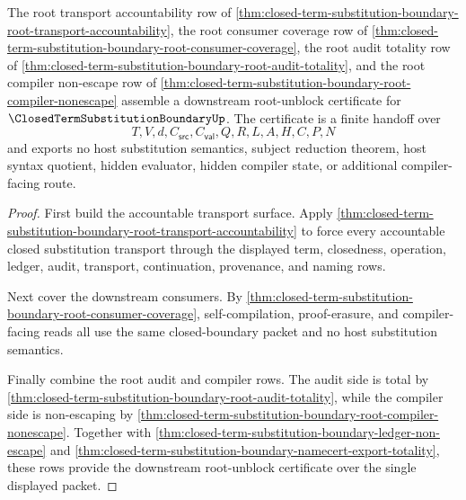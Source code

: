 \begin{theorem}
\label{thm:closed-term-substitution-boundary-root-unblock-certificate}
The root transport accountability row of \autoref{thm:closed-term-substitution-boundary-root-transport-accountability}, the root consumer coverage row of \autoref{thm:closed-term-substitution-boundary-root-consumer-coverage}, the root audit totality row of \autoref{thm:closed-term-substitution-boundary-root-audit-totality}, and the root compiler non-escape row of \autoref{thm:closed-term-substitution-boundary-root-compiler-nonescape} assemble a downstream root-unblock certificate for $\ClosedTermSubstitutionBoundaryUp$. The certificate is a finite handoff over
$$
T,V,d,C_{\mathsf{src}},C_{\mathsf{val}},Q,R,L,A,H,C,P,N
$$
and exports no host substitution semantics, subject reduction theorem, host syntax quotient, hidden evaluator, hidden compiler state, or additional compiler-facing route.
\end{theorem}
\begin{proof}
First build the accountable transport surface. Apply \autoref{thm:closed-term-substitution-boundary-root-transport-accountability} to force every accountable closed substitution transport through the displayed term, closedness, operation, ledger, audit, transport, continuation, provenance, and naming rows.

Next cover the downstream consumers. By \autoref{thm:closed-term-substitution-boundary-root-consumer-coverage}, self-compilation, proof-erasure, and compiler-facing reads all use the same closed-boundary packet and no host substitution semantics.

Finally combine the root audit and compiler rows. The audit side is total by \autoref{thm:closed-term-substitution-boundary-root-audit-totality}, while the compiler side is non-escaping by \autoref{thm:closed-term-substitution-boundary-root-compiler-nonescape}. Together with \autoref{thm:closed-term-substitution-boundary-ledger-non-escape} and \autoref{thm:closed-term-substitution-boundary-namecert-export-totality}, these rows provide the downstream root-unblock certificate over the single displayed packet.
\end{proof}

